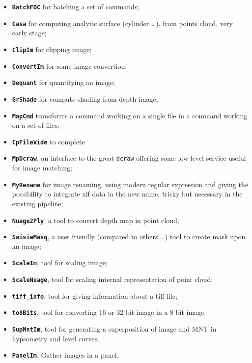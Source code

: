 \begin{itemize}
   \item {\tt \bf BatchFDC} for batching a set of commands;

   \item {\tt \bf Casa} for computing analytic surface (cylinder \dots),
                        from points cloud, very early stage;

   \item {\tt \bf ClipIm} for clipping image;

   \item {\tt \bf ConvertIm} for some image convertion;

   \item {\tt \bf Dequant} for quantifying an image;

   \item {\tt \bf GrShade} for compute shading from depth image;

   \item {\tt \bf MapCmd} transforms a command working on a single file in a command
         working on a set of files;

   \item {\tt \bf CpFileVide}   to complete

   \item {\tt \bf MpDcraw}, an interface to the great {\tt dcraw} offering some low-level
         service useful for image matching;

   \item {\tt \bf MyRename} for image renaming, using modern regular expression and giving the possibility
         to integrate xif data in the new name, tricky but necessary in the existing pipeline;

    \item {\tt \bf Nuage2Ply}, a tool to convert depth map in point cloud;

   \item {\tt \bf SaisieMasq}, a user friendly (compared to others \dots) tool to create
         mask upon an image;

   \item {\tt \bf ScaleIm}, tool for scaling image;

   \item {\tt \bf ScaleNuage}, tool for scaling internal representation of point cloud;

   \item {\tt \bf tiff\_info}, tool for giving information about a tiff file;

   \item {\tt \bf to8Bits}, tool for converting $16$ or $32$ bit image in a $8$ bit image.

   \item {\tt \bf SupMntIm}, tool for generating a superposition of image and MNT in hypsometry
         and level curves.

   \item {\tt \bf PanelIm}. Gather images in a panel.
\end{itemize}









